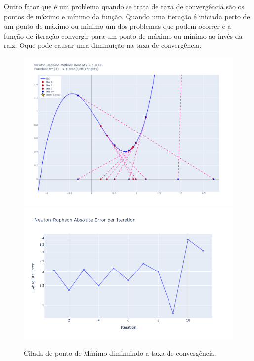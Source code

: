 Outro fator que é um problema quando se trata de taxa de convergência são os pontos de máximo e mínimo da função. Quando uma iteração é iniciada perto de um ponto de máximo ou mínimo um dos problemas que podem ocorrer é a função de iteração convergir para um ponto de máximo ou mínimo ao invés da raiz. Oque pode causar uma diminuição na taxa de convergência.
\begin{figure}[H]
    \centering 
    \includegraphics[width=1\textwidth]{Imagens/pitfalls/02/max_min.png}
    \includegraphics[width=1\textwidth]{Imagens/pitfalls/02/err_max_min.png}
    \caption{Cilada de ponto de Mínimo diminuindo a taxa de convergência.}
    \label{fig:ciladaMinMax_A}
\end{figure}

